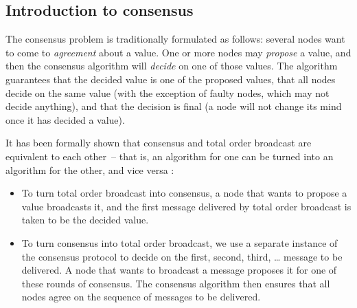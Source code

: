 \subsection{Introduction to consensus}

The consensus problem is traditionally formulated as follows: several nodes want to come to \emph{agreement} about a value.
One or more nodes may \emph{propose} a value, and then the consensus algorithm will \emph{decide} on one of those values.
The algorithm guarantees that the decided value is one of the proposed values, that all nodes decide on the same value (with the exception of faulty nodes, which may not decide anything), and that the decision is final (a node will not change its mind once it has decided a value).

It has been formally shown that consensus and total order broadcast are equivalent to each other~-- that is, an algorithm for one can be turned into an algorithm for the other, and vice versa \citep{Chandra:1996}:
\begin{itemize}
    \item To turn total order broadcast into consensus, a node that wants to propose a value broadcasts it, and the first message delivered by total order broadcast is taken to be the decided value.
    \item To turn consensus into total order broadcast, we use a separate instance of the consensus protocol to decide on the first, second, third, {\dots} message to be delivered.
        A node that wants to broadcast a message proposes it for one of these rounds of consensus.
        The consensus algorithm then ensures that all nodes agree on the sequence of messages to be delivered.
\end{itemize}

